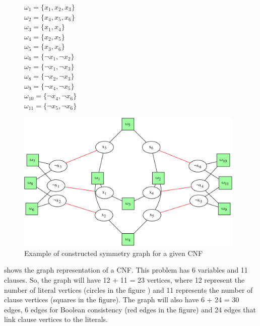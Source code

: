\begin{figure}[!htbp]
 \begin{minipage}[c]{.2\textwidth}
  $\omega_{1} = \{ x_{1}, x_{2}, x_{3} \}$ \\
  $\omega_{2} = \{ x_{4}, x_{5}, x_{6} \}$ \\
  $\omega_{3} = \{ x_{1}, x_{4} \}$ \\
  $\omega_{4} = \{ x_{2}, x_{5} \}$ \\
  $\omega_{5} = \{ x_{3}, x_{6} \}$ \\
  $\omega_{6} = \{ \neg x_{1}, \neg x_{2} \}$ \\
  $\omega_{7} = \{ \neg x_{1}, \neg x_{3} \}$ \\
  $\omega_{8} = \{ \neg x_{2}, \neg x_{3} \}$ \\
  $\omega_{9} = \{ \neg x_{4}, \neg x_{5} \}$ \\
  $\omega_{10} = \{ \neg x_{4}, \neg x_{6} \}$ \\
  $\omega_{11} = \{ \neg x_{5}, \neg x_{6} \}$ \\
  
 \end{minipage}
 \begin{minipage}[l]{.75\textwidth}
  \includegraphics[width=4.3in]{cnfs/graph_cnf_no_opt-crop}
 \end{minipage}
 \caption{Example of constructed symmetry graph for a given CNF}
 \label{fig:graph_no_opt}
\end{figure}
 shows the graph representation of a CNF. This problem has 6 variables and 11
clauses. So, the graph will have  12  + 11 = 23 vertices, where 12 represent the number of literal vertices (circles in the figure ) 
and 11 represents the number of clause vertices (squares in the figure). The graph will also have 6 + 24 = 30 edges, 6 
edges for Boolean consistency (red edges in the figure) and 24 edges that link clause vertices to the literals.
